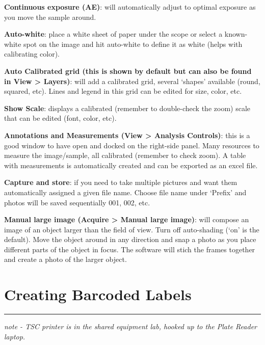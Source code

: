 \documentclass[
  letterpaper,
  DIV=11,
  numbers=noendperiod]{scrreprt}
\begin{document}

\textbf{Continuous exposure (AE)}: will automatically adjust to optimal
exposure as you move the sample around.

\textbf{Auto-white}: place a white sheet of paper under the scope or
select a known-white spot on the image and hit auto-white to define it
as white (helps with calibrating color).

\textbf{Auto Calibrated grid (this is shown by default but can also be
found in View \textgreater{} Layers)}: will add a calibrated grid,
several `shapes' available (round, squared, etc). Lines and legend in
this grid can be edited for size, color, etc.

\textbf{Show Scale}: displays a calibrated (remember to double-check the
zoom) scale that can be edited (font, color, etc).

\textbf{Annotations and Measurements (View \textgreater{} Analysis
Controls)}: this is a good window to have open and docked on the
right-side panel. Many resources to measure the image/sample, all
calibrated (remember to check zoom). A table with measurements is
automatically created and can be exported as an excel file.

\textbf{Capture and store}: if you need to take multiple pictures and
want them automatically assigned a given file name. Choose file name
under `Prefix' and photos will be saved sequentially 001, 002, etc.

\textbf{Manual large image (Acquire \textgreater{} Manual large image)}:
will compose an image of an object larger than the field of view. Turn
off auto-shading (`on' is the default). Move the object around in any
direction and snap a photo as you place different parts of the object in
focus. The software will stich the frames together and create a photo of
the larger object.

\hypertarget{creating-barcoded-labels}{%
\chapter{Creating Barcoded Labels}\label{creating-barcoded-labels}}

\begin{center}\rule{0.5\linewidth}{0.5pt}\end{center}

\emph{note - TSC printer is in the shared equipment lab, hooked up to
the Plate Reader laptop.}
\end{document}
